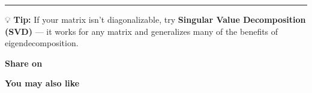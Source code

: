 \documentclass[
  letterpaper,
  DIV=11,
  numbers=noendperiod]{scrartcl}
\begin{document}
\begin{center}\rule{0.5\linewidth}{0.5pt}\end{center}

💡 \textbf{Tip:} If your matrix isn't diagonalizable, try
\textbf{Singular Value Decomposition (SVD)} --- it works for any matrix
and generalizes many of the benefits of eigendecomposition.

\textbf{Share on}




\label{fb-root}

\textbf{You may also like}


\printbibliography
\end{document}
